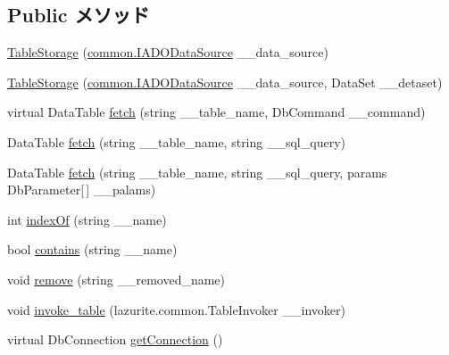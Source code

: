 \subsection*{Public メソッド}
\begin{DoxyCompactItemize}
\item 
\hyperlink{classlazurite_1_1relation_1_1_table_storage_a9f9c6fa79fc56dd2cf4789e20f4d6431}{TableStorage} (\hyperlink{interfacelazurite_1_1relation_1_1common_1_1_i_a_d_o_data_source}{common.IADODataSource} \_\-\_\-data\_\-source)
\item 
\hyperlink{classlazurite_1_1relation_1_1_table_storage_a8f92c96375b8b1077f283675cc698651}{TableStorage} (\hyperlink{interfacelazurite_1_1relation_1_1common_1_1_i_a_d_o_data_source}{common.IADODataSource} \_\-\_\-data\_\-source, DataSet \_\-\_\-detaset)
\item 
virtual DataTable \hyperlink{classlazurite_1_1relation_1_1_table_storage_a0e234b13cc79ab830d45d4e78a6fb8c7}{fetch} (string \_\-\_\-table\_\-name, DbCommand \_\-\_\-command)
\item 
DataTable \hyperlink{classlazurite_1_1relation_1_1_table_storage_a1de112fe907e377581cea36721cf88c3}{fetch} (string \_\-\_\-table\_\-name, string \_\-\_\-sql\_\-query)
\item 
DataTable \hyperlink{classlazurite_1_1relation_1_1_table_storage_a32ad75f76cbf4ec2b89e86097fc35163}{fetch} (string \_\-\_\-table\_\-name, string \_\-\_\-sql\_\-query, params DbParameter\mbox{[}$\,$\mbox{]} \_\-\_\-palams)
\item 
int \hyperlink{classlazurite_1_1relation_1_1_table_storage_a34ba464646b611d991ab71cc063e908a}{indexOf} (string \_\-\_\-name)
\item 
bool \hyperlink{classlazurite_1_1relation_1_1_table_storage_a5b26c8b4b586befb3131fef66e57116a}{contains} (string \_\-\_\-name)
\item 
void \hyperlink{classlazurite_1_1relation_1_1_table_storage_a68dfa6f296ed84619e4202458fdc22b9}{remove} (string \_\-\_\-removed\_\-name)
\item 
void \hyperlink{classlazurite_1_1relation_1_1_table_storage_a05912e12da13da956ae1ea91999e2074}{invoke\_\-table} (lazurite.common.TableInvoker \_\-\_\-invoker)
\item 
virtual DbConnection \hyperlink{classlazurite_1_1relation_1_1_table_storage_adfc3668d59e3ef868b63960a6b45c130}{getConnection} ()
\end{DoxyCompactItemize}
